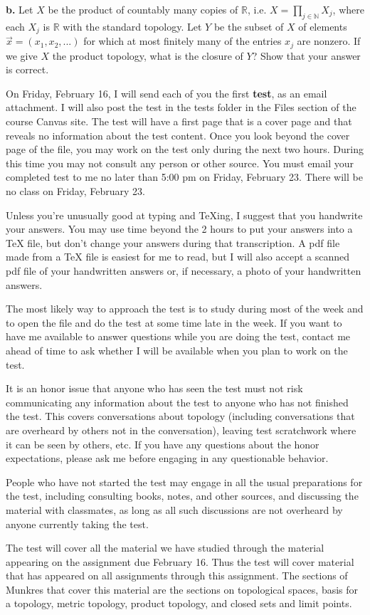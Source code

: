 \documentclass{amsart}
\theoremstyle{plain}
\theoremstyle{definition}
\theoremstyle{remark}
\begin{document}
\vspace{.1in}

{\bfseries b.} Let $X$ be the product of countably many copies of $\mathbb R$, i.e. $X = \prod _{j\in \mathbb N } X_j$, where each $X_j$ is $\mathbb R$ with the standard topology. Let $Y$ be the subset of $X$ of elements $\vec{x} = ( x_1 , x_2 , . . . )$ for which at most finitely many of the entries $x_j$ are nonzero. If we give $X$ the product topology, what is the closure of $Y$? Show that your answer is correct. 

\vspace{.45in}
On Friday, February 16, I will send each of you the first {\bfseries test}, as an email attachment. I will also post the test in the tests folder in the Files section of the course Canvas site. The test will have a first page that is a cover page and that reveals no information about the test content.   Once you look beyond the cover page of the file, you may work on the test only during the next two hours.  During this time you may not consult any person or other source.  You must email your completed test to me 
no later than 5:00 pm on Friday, February 23.  There will be no class 
on Friday, February 23.  

Unless you're unusually good at typing and TeXing, I suggest that you handwrite your answers. You may use time beyond the 2 hours to put your answers into a TeX file, but don't change your answers during that transcription. A pdf file made from a TeX file is easiest for me to read, but I will also accept a scanned pdf file of your handwritten answers or, if necessary, a photo of your handwritten answers.

The most likely way to approach the test is to study during most of 
the week and to open the file and do the test at some time late in the week.  If you want to have me available to answer questions while you are doing the test, contact me ahead of time to ask whether I will be available when you plan to work on the test. 

It is an honor issue that anyone who has seen the test must not risk 
communicating any information about the test to anyone who has not 
finished the test.  This covers conversations about topology   
(including conversations that are overheard by others not in the 
conversation), leaving test scratchwork where it can be seen by others, etc.  If you have 
any questions about the honor expectations, please ask me before 
engaging in any questionable behavior.  

People who have not started the test may engage in all the usual 
preparations for the test, including consulting books, notes, and 
other sources, and discussing the material with classmates, as long as 
all such discussions are not overheard by anyone currently taking the 
test.

The test will cover all the material we have studied through the 
material appearing on the assignment due February 16.  Thus the test will cover material that has appeared on all assignments through this assignment. The sections of Munkres that cover this material are the sections on topological spaces, basis for a topology, metric topology, product topology, and closed sets and limit points. 


 
\end{document}
